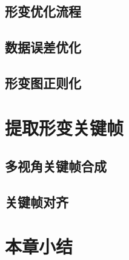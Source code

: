 \subsection{形变优化流程}                                                                                                                                                                                                                                                                                                                                                                                                                                                                                                                                                                                                                                                                                          
\subsection{数据误差优化}
\subsection{形变图正则化}
\section{提取形变关键帧}
\subsection{多视角关键帧合成}
\subsection{关键帧对齐}
\section{本章小结}